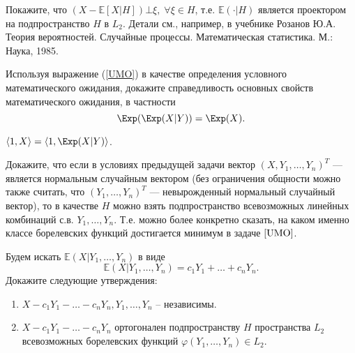\begin{ordre}
Покажите, что $(X-{\mathbb E}[X|H]) \bot \xi,\; \forall\xi\in H$, т.е. ${\mathbb E}(\cdot|H)$ 
является проектором на подпространство $H$ в $L_2$. Детали см., например, в учебнике Розанов Ю.А. Теория вероятностей. Случайные процессы. Математическая статистика. М.: Наука, 1985.
\end{ordre}

\begin{problem}
Используя выражение (\ref{UMO}) в качестве определения условного математического ожидания, докажите справедливость основных свойств математического ожидания, в частности
\[
\Exp(\Exp(X|Y)) = \Exp(X). 
\]
\end{problem}

\begin{ordre}
$\langle 1, X \rangle = \langle 1, \Exp(X|Y) \rangle$.
\end{ordre}


\begin{problem}
\label{condExp3}
Докажите, что если в условиях предыдущей задачи вектор $(X,Y_1,\ldots,Y_n)^T$ --- является нормальным случайным вектором (без ограничения 
общности можно также считать, что $(Y_1,\ldots,Y_n)^T$  --- невырожденный нормальный случайный вектор), то в качестве $H$ можно взять 
подпространство всевозможных линейных комбинаций с.в. $Y_1,\ldots,Y_n$. Т.е. можно более конкретно сказать, на каком именно 
классе борелевских функций достигается минимум в задаче $\ref{UMO}$. 
\end{problem}

\begin{ordre}
Будем искать 
${\mathbb E}(X|Y_1,\ldots,Y_n)$ в виде 
$$
\label{Gauss}
{\mathbb E}(X|Y_1,\ldots,Y_n)=c_1 Y_1+\ldots +c_n Y_n . 
$$
Докажите следующие утверждения:

\begin{enumerate}
\item $X-c_1 Y_1-\ldots-c_n Y_n, Y_1,\ldots, Y_n$ -- независимы.
\item $X-c_1 Y_1-\ldots-c_n Y_n$ ортогонален подпространству $H$ пространства $L_2$ всевозможных борелевских функций $\varphi(Y_1,\ldots,Y_n)\in L_2$.
\end{enumerate}
 
\end{ordre}


